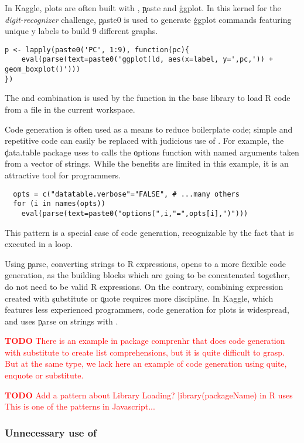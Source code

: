 \documentclass[review,screen,acmsmall,anonymous=true]{acmart}
\newcommand{\authorcomment}[3]{\xspace\textcolor{#1}{{\bf #2} #3}\xspace}
\newcommand{\todo}[1]{\authorcomment{red}{TODO}{#1}}
\begin{document}
In Kaggle, plots are often built with \eval, \c{paste} and \c{ggplot}. In this kernel for the \emph{digit-recognizer} challenge, \c{paste0} is used to generate \c{ggplot} commands featuring unique y labels to build 9 different graphs.

\begin{lstlisting}
p <- lapply(paste0('PC', 1:9), function(pc){
	eval(parse(text=paste0('ggplot(ld, aes(x=label, y=',pc,')) + geom_boxplot()')))
})
\end{lstlisting}

The \parse and \eval combination is
used by the \source function in the base library to load R code from a file
in the current workspace. 

 Code generation is often used as a means to reduce boilerplate code;
simple and repetitive code can easily be replaced with judicious use of \eval.
For example, the \c{data.table} package uses \eval to calls the \c{options}
function with named arguments taken from a vector of strings. While the benefits
are limited in this example, it is an attractive tool for programmers.
\begin{lstlisting}
  opts = c("datatable.verbose"="FALSE", # ...many others
  for (i in names(opts))
    eval(parse(text=paste0("options(",i,"=",opts[i],")")))
\end{lstlisting}
This pattern is a special case of code generation, recognizable by the
fact that \eval is executed in a loop. 

Using \c{parse}, \ie converting strings to R expressions, opens to a more flexible code generation, as the building blocks which are going to be concatenated together, do not need to be valid R expressions. On the contrary, combining expression created with \c{substitute} or \c{quote} requires more discipline. In Kaggle, which features less experienced programmers,  code generation for plots is widespread, and uses \c{parse} on strings with \eval.

\todo{There is an example in package comprenhr that does code generation with substitute to create list comprehensions, but it is quite difficult to grasp. But at the same type, we lack here an example of code generation using quite, enquote or substitute.}

\todo{Add a pattern about Library Loading? \c{library(packageName)} in R uses \eval This is one of the patterns in Javascript...}

\subsubsection{Unnecessary use of \eval}
\end{document}
